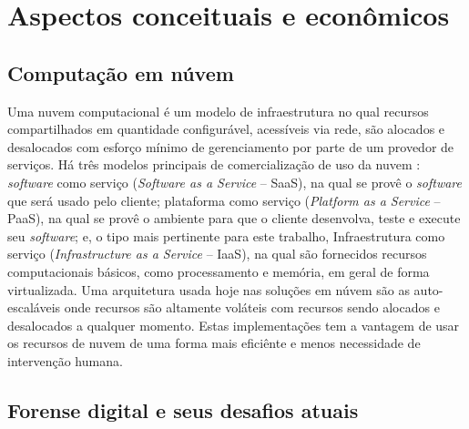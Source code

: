 \chapter{Aspectos conceituais e econômicos}

\section{Computação em núvem}
\label{sec:computacaonuvem}

Uma nuvem computacional é um modelo de infraestrutura no qual recursos compartilhados em quantidade configurável, acessíveis via rede, são alocados e desalocados com esforço mínimo de gerenciamento por parte de um provedor de serviços. \cite{NIST2011}
%
Há três modelos principais de comercialização de uso da nuvem \cite{NIST2011}: \textit{software} como serviço (\textit{Software as a Service} -- SaaS), na qual se provê o \textit{software} que será usado pelo cliente; plataforma como serviço (\textit{Platform as a Service} -- PaaS), na qual se provê o ambiente para que o cliente desenvolva, teste e execute seu \textit{software}; e, o tipo mais pertinente para este trabalho, Infraestrutura como serviço (\textit{Infrastructure as a Service} -- IaaS), na qual são fornecidos recursos computacionais básicos, como processamento e memória, em geral de forma virtualizada.
%
Uma arquitetura usada hoje nas soluções em núvem são as auto-escaláveis onde recursos são altamente voláteis com recursos sendo alocados e desalocados a qualquer momento. Estas implementações tem a vantagem de usar os recursos de nuvem de uma forma mais eficiênte e menos necessidade de intervenção humana.

\section{Forense digital e seus desafios atuais}
\label{sec:forensedigital}

